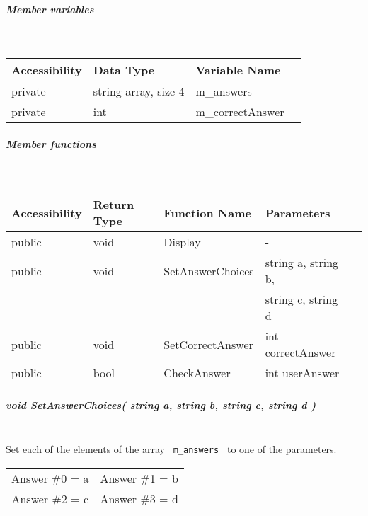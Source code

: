 \documentclass[a4paper,12pt]{book}
\begin{document}
                        \subparagraph{ Member variables } ~\\
                            
                            \begin{tabular}{ l l l l }
                                Accessibility & Data Type & Variable Name \\ \hline{}
                                private & string array, size 4 & m\_answers \\ \hline{}
                                private & int & m\_correctAnswer
                            \end{tabular}
                        
                        \subparagraph{ Member functions } ~\\

                            \begin{tabular}{ l l l l l }
                                Accessibility & Return Type & Function Name & Parameters  \\ \hline{}
                                public & void & Display & -  \\ \hline{}
                                public & void & SetAnswerChoices & string a, string b, \\
                                & & & string c, string d \\ \hline{}
                                public & void & SetCorrectAnswer & int correctAnswer \\ \hline{}
                                public & bool & CheckAnswer & int userAnswer
                            \end{tabular}


                        
                        \subparagraph{ void SetAnswerChoices( string a, string b, string c, string d ) } ~\\
                            Set each of the elements of the array \texttt{ m\_answers }
                            to one of the parameters. \\

                            \begin{tabular}{ c c }
                                Answer \#0 = a &
                                Answer \#1 = b \\
                                Answer \#2 = c &
                                Answer \#3 = d
                            \end{tabular}
                            
\end{document}
